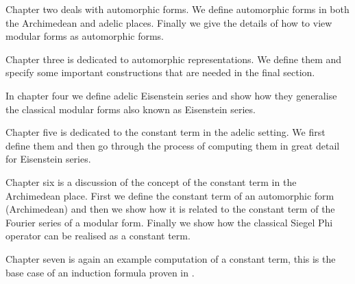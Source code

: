 Chapter two deals with automorphic forms. We define automorphic forms in both the Archimedean and adelic places. Finally we give the details of how to view modular forms as automorphic forms. 

Chapter three is dedicated to automorphic representations. We define them and specify some important constructions that are needed in the final section.

In chapter four we define adelic Eisenstein series and show how they generalise the classical modular forms also known as Eisenstein series.

Chapter five is dedicated to the constant term in the adelic setting. We first define them and then go through the process of computing them in great detail for Eisenstein series. 

Chapter six is a discussion of the concept of the constant term in the Archimedean place. First we define the constant term of an automorphic form (Archimedean) and then we show how it is related to the constant term of the Fourier series of a modular form. Finally we show how the classical Siegel Phi operator can be realised as a constant term.

Chapter seven is again an example computation of a constant term, this is the base case of an induction formula proven in \cite{jiangPolesCertainResidual2013}.


